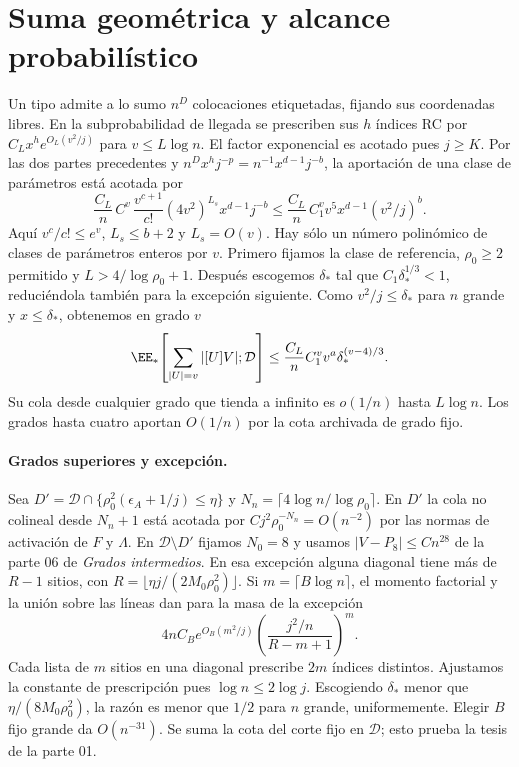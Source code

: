 \section{Suma geométrica y alcance probabilístico}
Un tipo admite a lo sumo $n^D$ colocaciones etiquetadas, fijando sus coordenadas
libres. En la subprobabilidad de llegada se prescriben sus $h$ índices RC por
$C_L x^h e^{O_L(v^2/j)}$ para $v\le L\log n$. El factor exponencial es acotado
pues $j\ge K$. Por las dos partes precedentes y
$n^D x^h j^{-p}=n^{-1}x^{d-1}j^{-b}$, la aportación de una clase de parámetros
está acotada por
\[
 \frac{C_L}{n}\,C^v\,\frac{v^{c+1}}{c!}(4v^2)^{L_s}
            x^{d-1}j^{-b}
 \le\frac{C_L}{n}\, C_1^v v^5 x^{d-1}(v^2/j)^b .
\]
Aquí $v^c/c!\le e^v$, $L_s\le b+2$ y $L_s=O(v)$. Hay sólo un número polinómico
de clases de parámetros enteros por $v$. Primero fijamos la clase de referencia,
$\rho_0\ge2$ permitido y $L>4/\log\rho_0+1$. Después escogemos $\delta_*$ tal
que $C_1\delta_*^{1/3}<1$, reduciéndola también para la excepción siguiente.
Como $v^2/j\le\delta_*$ para $n$ grande y $x\le\delta_*$, obtenemos en grado $v$
\[
 \EE_*\!\left[\sum_{|U|=v}|[U]V|;\mathcal D\right]
 \le \frac{C_L}{n}C_1^v v^{a}\delta_*^{(v-4)/3}.
\]
Su cola desde cualquier grado que tienda a infinito es $o(1/n)$ hasta $L\log n$.
Los grados hasta cuatro aportan $O(1/n)$ por la cota archivada de grado fijo.
\paragraph{Grados superiores y excepción.}
Sea $D'=\mathcal D\cap\{\rho_0^2(\epsilon_A+1/j)\le\eta\}$ y
$N_n=\lceil4\log n/\log\rho_0\rceil$. En $D'$ la cola no colineal desde $N_n+1$
está acotada por $Cj^2\rho_0^{-N_n}=O(n^{-2})$ por las normas de activación
de $F$ y $\Lambda$. En $\mathcal D\setminus D'$ fijamos $N_0=8$ y usamos
$|V-P_8|\le Cn^{28}$ de la parte 06 de \emph{Grados intermedios}.
En esa excepción alguna diagonal tiene más de $R-1$ sitios, con
$R=\lfloor\eta j/(2M_0\rho_0^2)\rfloor$. Si $m=\lceil B\log n\rceil$,
el momento factorial y la unión sobre las líneas dan para la masa de la excepción
\[
 4n C_B e^{O_B(m^2/j)}
       \left(\frac{j^2/n}{R-m+1}\right)^m .
\]
Cada lista de $m$ sitios en una diagonal prescribe $2m$ índices distintos.
Ajustamos la constante de prescripción pues $\log n\le2\log j$.
Escogiendo $\delta_*$ menor que $\eta/(8M_0\rho_0^2)$, la razón es menor que
$1/2$ para $n$ grande, uniformemente. Elegir $B$ fijo grande da $O(n^{-31})$.
Se suma la cota del corte fijo en $\mathcal D$; esto prueba la tesis de la parte 01.
